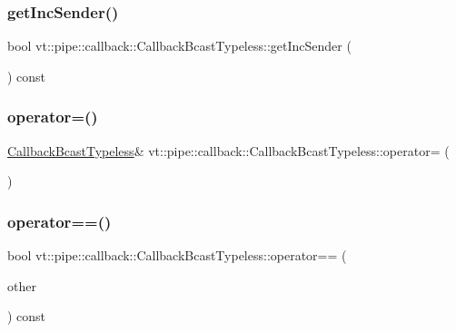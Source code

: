 \subsubsection{\texorpdfstring{get\+Inc\+Sender()}{getIncSender()}}
{\footnotesize\ttfamily bool vt\+::pipe\+::callback\+::\+Callback\+Bcast\+Typeless\+::get\+Inc\+Sender (\begin{DoxyParamCaption}{ }\end{DoxyParamCaption}) const\hspace{0.3cm}{\ttfamily [inline]}}

\mbox{\label{structvt_1_1pipe_1_1callback_1_1_callback_bcast_typeless_acad87bb1887561979d41c298896463e3}} 
\subsubsection{\texorpdfstring{operator=()}{operator=()}}
{\footnotesize\ttfamily \hyperlink{structvt_1_1pipe_1_1callback_1_1_callback_bcast_typeless}{Callback\+Bcast\+Typeless}\& vt\+::pipe\+::callback\+::\+Callback\+Bcast\+Typeless\+::operator= (\begin{DoxyParamCaption}\item[{\hyperlink{structvt_1_1pipe_1_1callback_1_1_callback_bcast_typeless}{Callback\+Bcast\+Typeless} const \&}]{ }\end{DoxyParamCaption})\hspace{0.3cm}{\ttfamily [default]}}

\mbox{\label{structvt_1_1pipe_1_1callback_1_1_callback_bcast_typeless_a38b71fafbb0f2e6ce000eaa5faec463c}} 
\subsubsection{\texorpdfstring{operator==()}{operator==()}}
{\footnotesize\ttfamily bool vt\+::pipe\+::callback\+::\+Callback\+Bcast\+Typeless\+::operator== (\begin{DoxyParamCaption}\item[{\hyperlink{structvt_1_1pipe_1_1callback_1_1_callback_bcast_typeless}{Callback\+Bcast\+Typeless} const \&}]{other }\end{DoxyParamCaption}) const\hspace{0.3cm}{\ttfamily [inline]}}

